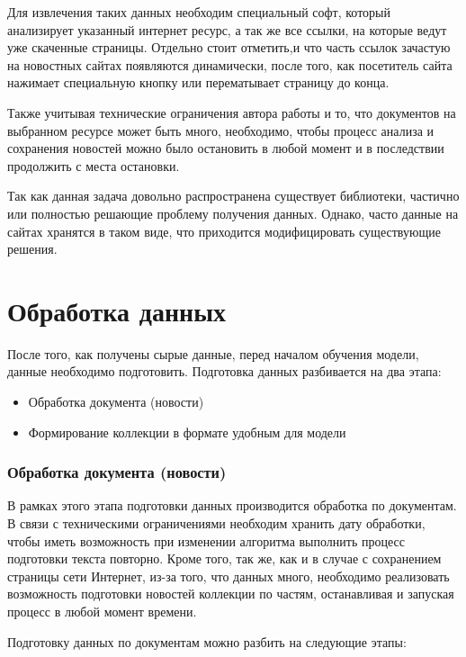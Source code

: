 Для извлечения таких данных необходим специальный софт, который анализирует указанный интернет ресурс, а так же все ссылки, на которые ведут уже скаченные страницы. Отдельно стоит отметить,и что часть ссылок зачастую на новостных сайтах появляются динамически, после того, как посетитель сайта нажимает специальную кнопку или перематывает страницу до конца.

Также учитывая технические ограничения автора работы и то, что документов на выбранном ресурсе может быть много, необходимо, чтобы процесс анализа и сохранения новостей можно было остановить в любой момент и в последствии продолжить с места остановки.

Так как данная задача довольно распространена существует библиотеки, частично или полностью решающие проблему получения данных. Однако, часто данные на сайтах хранятся в таком виде, что приходится модифицировать существующие решения. 

%
\section{Обработка данных}


После того, как получены сырые данные, перед началом обучения модели, данные необходимо подготовить. Подготовка данных разбивается на два этапа:

\begin{itemize}
    \item Обработка документа (новости)
    \item Формирование коллекции в формате удобным для модели
\end{itemize}

%
\subsubsection{Обработка документа (новости)}

В рамках этого этапа подготовки данных производится обработка по документам. В связи с техническими ограничениями необходим хранить дату обработки, чтобы иметь возможность при изменении алгоритма выполнить процесс подготовки текста повторно. Кроме того, так же, как и в случае с сохранением страницы сети Интернет, из-за того, что данных много, необходимо реализовать возможность подготовки новостей коллекции по частям, останавливая и запуская процесс в любой момент времени.

Подготовку данных по документам можно разбить на следующие этапы:

